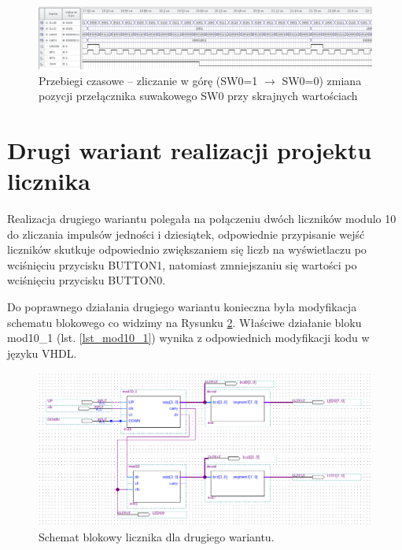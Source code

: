 \documentclass{classrep}
\begin{document}
\begin{figure}[H]
	\centering
	\includegraphics[width=1.0\linewidth]{up_down_inv_2.png}
	\caption{Przebiegi czasowe – zliczanie w górę (SW0=1 $\longrightarrow$ SW0=0) zmiana pozycji przełącznika suwakowego SW0 przy skrajnych wartościach }
	\label{fig:symhex3}
\end{figure}

\section{ Drugi wariant realizacji projektu licznika}

Realizacja drugiego wariantu polegała na połączeniu dwóch liczników modulo 10 do zliczania
impulsów jedności i dziesiątek, odpowiednie przypisanie wejść liczników skutkuje odpowiednio
zwiększaniem się liczb na wyświetlaczu po wciśnięciu przycisku BUTTON1, natomiast zmniejszaniu się
wartości po wciśnięciu przycisku BUTTON0.

Do poprawnego działania drugiego wariantu konieczna była modyfikacja schematu blokowego co
widzimy na Rysunku \ref{fig:block1}. Właściwe działanie bloku mod10\_1 (lst. \ref{lst_mod10_1}) wynika z odpowiednich modyfikacji
kodu w języku VHDL.\\

\begin{figure}[H]  %
	\centering
	\includegraphics[width=1.0\linewidth]{blok1.png}  %
	\caption{ Schemat blokowy licznika dla drugiego wariantu. }
	\label{fig:block1}
\end{figure}
\end{document}

